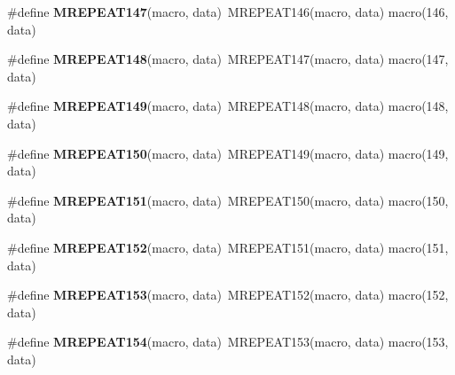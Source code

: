 \begin{DoxyCompactItemize}
\item 
\hypertarget{group__group__xmega__utils__mrepeat_ga5fde582a7cf940039364190fade97523}{\#define {\bfseries M\-R\-E\-P\-E\-A\-T147}(macro, data)~M\-R\-E\-P\-E\-A\-T146(macro, data)   macro(146, data)}\label{group__group__xmega__utils__mrepeat_ga5fde582a7cf940039364190fade97523}

\item 
\hypertarget{group__group__xmega__utils__mrepeat_gae6c61eb095a85d084a71dee42aa35eac}{\#define {\bfseries M\-R\-E\-P\-E\-A\-T148}(macro, data)~M\-R\-E\-P\-E\-A\-T147(macro, data)   macro(147, data)}\label{group__group__xmega__utils__mrepeat_gae6c61eb095a85d084a71dee42aa35eac}

\item 
\hypertarget{group__group__xmega__utils__mrepeat_ga18ca1b3d19447f3bbe8d3d10c5f238b2}{\#define {\bfseries M\-R\-E\-P\-E\-A\-T149}(macro, data)~M\-R\-E\-P\-E\-A\-T148(macro, data)   macro(148, data)}\label{group__group__xmega__utils__mrepeat_ga18ca1b3d19447f3bbe8d3d10c5f238b2}

\item 
\hypertarget{group__group__xmega__utils__mrepeat_ga4b6a38c831a6d78f44cc9348c496dc5a}{\#define {\bfseries M\-R\-E\-P\-E\-A\-T150}(macro, data)~M\-R\-E\-P\-E\-A\-T149(macro, data)   macro(149, data)}\label{group__group__xmega__utils__mrepeat_ga4b6a38c831a6d78f44cc9348c496dc5a}

\item 
\hypertarget{group__group__xmega__utils__mrepeat_gad53956dd011ee41e4542fc564f2102f0}{\#define {\bfseries M\-R\-E\-P\-E\-A\-T151}(macro, data)~M\-R\-E\-P\-E\-A\-T150(macro, data)   macro(150, data)}\label{group__group__xmega__utils__mrepeat_gad53956dd011ee41e4542fc564f2102f0}

\item 
\hypertarget{group__group__xmega__utils__mrepeat_ga6426d25194d019d1aaeca1448aeba07d}{\#define {\bfseries M\-R\-E\-P\-E\-A\-T152}(macro, data)~M\-R\-E\-P\-E\-A\-T151(macro, data)   macro(151, data)}\label{group__group__xmega__utils__mrepeat_ga6426d25194d019d1aaeca1448aeba07d}

\item 
\hypertarget{group__group__xmega__utils__mrepeat_gac8eb62a598002e65a7aee5ffce9daefb}{\#define {\bfseries M\-R\-E\-P\-E\-A\-T153}(macro, data)~M\-R\-E\-P\-E\-A\-T152(macro, data)   macro(152, data)}\label{group__group__xmega__utils__mrepeat_gac8eb62a598002e65a7aee5ffce9daefb}

\item 
\hypertarget{group__group__xmega__utils__mrepeat_ga70ba0c83bec304aec635e40497033340}{\#define {\bfseries M\-R\-E\-P\-E\-A\-T154}(macro, data)~M\-R\-E\-P\-E\-A\-T153(macro, data)   macro(153, data)}\label{group__group__xmega__utils__mrepeat_ga70ba0c83bec304aec635e40497033340}


\end{DoxyCompactItemize}

